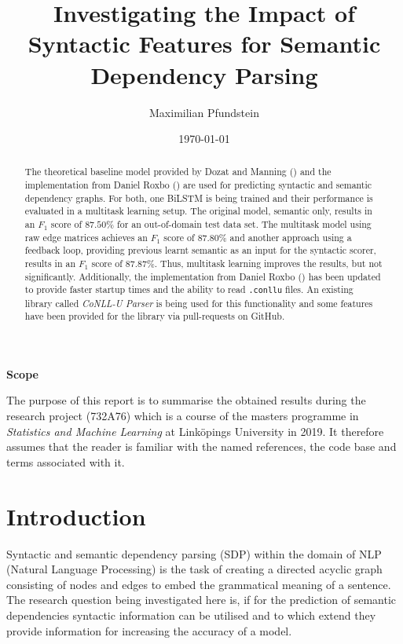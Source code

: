\documentclass[11pt]{scrartcl}
\title{Investigating the Impact of Syntactic Features for Semantic Dependency Parsing}
\author{Maximilian Pfundstein}
\date{\today}
\begin{document}
\maketitle
\begin{abstract}

The theoretical baseline model provided by Dozat and Manning (\cite{zeman-etal-2017-conll}) and the implementation from Daniel Roxbo (\cite{Roxbo1315439}) are used for predicting syntactic and semantic dependency graphs. For both, one BiLSTM is being trained and their performance is evaluated in a multitask learning setup. The original model, semantic only, results in an $F_1$ score of $87.50\%$ for an out-of-domain test data set. The multitask model using raw edge matrices achieves an $F_1$ score of $87.80\%$ and another approach using a feedback loop, providing previous learnt semantic as an input for the syntactic scorer, results in an $F_1$ score of $87.87\%$. Thus, multitask learning improves the results, but not significantly. Additionally, the implementation from Daniel Roxbo (\cite{Roxbo1315439}) has been updated to provide faster startup times and the ability to read \texttt{.conllu} files. An existing library called \textit{CoNLL-U Parser} is being used for this functionality and some features have been provided for the library via pull-requests on GitHub.

\end{abstract}

\clearpage

\tableofcontents

\clearpage

\vspace*{\fill}

\textbf{Scope}

The purpose of this report is to summarise the obtained results during the research project (732A76) which is a course of the masters programme in \textit{Statistics and Machine Learning} at Linköpings University in 2019. It therefore assumes that the reader is familiar with the named references, the code base and terms associated with it.

\vspace*{\fill}

\clearpage

\section{Introduction}

Syntactic and semantic dependency parsing (SDP) within the domain of NLP (Natural Language Processing) is the task of creating a directed acyclic graph consisting of nodes and edges to embed the grammatical meaning of a sentence. The research question being investigated here is, if for the prediction of semantic dependencies syntactic information can be utilised and to which extend they provide information for increasing the accuracy of a model.
\end{document}
